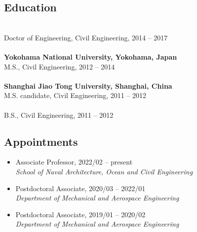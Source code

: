 \documentclass[10pt]{article}
\newenvironment{myitemize}
{ \begin{itemize}
    \setlength{\itemsep}{0pt}
    \setlength{\parskip}{0pt}
    \setlength{\parsep}{0pt}     }
{ \end{itemize}                  }
\begin{document}
\subsection*{Education}

	\\		
\indent Doctor of Engineering, Civil Engineering, 2014 -- 2017  \\
\\
 {\bf\color{Blue} Yokohama National University, Yokohama, Japan}\\
\indent M.S., Civil Engineering, 2012 -- 2014\\
\\
{\bf\color{Blue} Shanghai Jiao Tong University, Shanghai, China}\\
\indent M.S. candidate, Civil Engineering, 2011 -- 2012\\

\\
\indent B.S., Civil Engineering, 2011 -- 2012\\

\subsection*{Appointments}

\begin{myitemize}
\item Associate Professor, 2022/02 -- present \\
{\em School of Naval Architecture, Ocean and Civil Engineering}
\end{myitemize}

\begin{myitemize}
\item  Postdoctoral Associate, 2020/03 -- 2022/01\\
{\em Department of Mechanical and Aerospace Engineering}
\end{myitemize}

\begin{myitemize}
\item  Postdoctoral Associate, 2019/01 -- 2020/02\\
{\em Department of Mechanical and Aerospace Engineering}
\end{myitemize}
\end{document}

